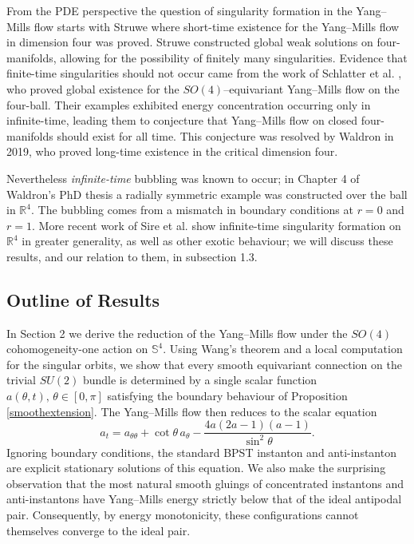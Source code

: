 \documentclass[11pt,a4paper]{article}
\numberwithin{equation}{section}
\theoremstyle{plain}
\theoremstyle{remark}
\begin{document}
From the PDE perspective the question of singularity formation in the Yang--Mills flow starts with Struwe \cite{struwe1994yangmills} where short-time existence for the Yang--Mills flow in dimension four was proved. Struwe constructed global weak solutions on four-manifolds, allowing for the possibility of finitely many singularities. Evidence that finite-time singularities should not occur came from the work of Schlatter et al. \cite{67fa8f92-32f2-39c3-bd3f-c407da60a7c7}, who proved global existence for the $SO(4)$--equivariant Yang--Mills flow on the four-ball. Their examples exhibited energy concentration occurring only in infinite-time, leading them to conjecture that Yang--Mills flow on closed four-manifolds should exist for all time. This conjecture was resolved by Waldron \cite{Waldron2019} in 2019, who proved long-time existence in the critical dimension four.

Nevertheless \emph{infinite-time} bubbling was known to occur; in Chapter 4 of Waldron's PhD thesis a radially symmetric example was constructed over the ball in $\mathbb{R}^4$. The bubbling comes from a mismatch in boundary conditions at $r=0$ and $r=1$. More recent work of  Sire et al. \cite{SireWeiZheng2022, sire2026globaloscillatorysolutionsyangmills} show infinite-time singularity formation on $\mathbb R^4$ in greater generality, as well as other exotic behaviour; we will discuss these results, and our relation to them, in subsection 1.3. 


\subsection{Outline of Results}

In Section 2 we derive the reduction of the Yang--Mills flow under the $SO(4)$ cohomogeneity-one action on $\mathbb{S}^4$. Using Wang's theorem \cite{Wang1958} and a local computation for the singular orbits, we show that every smooth equivariant connection on the trivial $SU(2)$ bundle is determined by a single scalar function $a(\theta,t),\,\theta\in[0,\pi]$ satisfying the boundary behaviour of Proposition \ref{smoothextension}. The Yang--Mills flow then reduces to the scalar equation
$$
a_t
=
a_{\theta\theta}
+
\cot\theta\, a_\theta
-
\frac{4a(2a-1)(a-1)}{\sin^2\theta}.
$$
Ignoring boundary conditions, the standard BPST instanton and anti-instanton are explicit stationary solutions of this equation. We also make the surprising observation that the most natural smooth gluings of concentrated instantons and anti-instantons have Yang–Mills energy strictly below that of the ideal antipodal pair. Consequently, by energy monotonicity, these configurations cannot themselves converge to the ideal pair.
\end{document}
